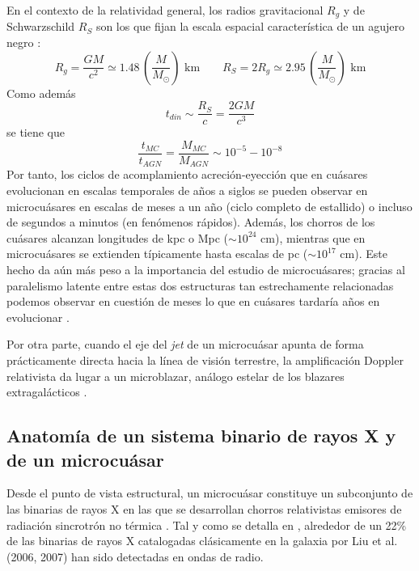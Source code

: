 En el contexto de la relatividad general, los radios gravitacional $R_g$ y de Schwarzschild $R_S$ son los que fijan la escala espacial característica de un agujero negro \cite{chaty,mornas2026bloque1}:
\begin{equation}
    R_g=\frac{GM}{c^2}\simeq 1.48\,\left(\frac{M}{M_\odot}\right)\mbox{ km}\qquad R_S=2 R_g\simeq 2.95\,\left(\frac{M}{M_\odot}\right)\mbox{ km}
\end{equation}
Como además
\begin{equation}
    t_{din}\sim\frac{R_S}{c}=\frac{2GM}{c^3}
\end{equation}
se tiene que \cite{chaty,mirabel}
\begin{equation}
    \frac{t_{MC}}{t_{AGN}}=\frac{M_{MC}}{M_{AGN}}\sim 10^{-5}-10^{-8}
\end{equation}
Por tanto, los ciclos de acomplamiento acreción-eyección que en cuásares evolucionan en escalas temporales de años a siglos se pueden observar en microcuásares en escalas de meses a un año (ciclo completo de estallido) o incluso de segundos a minutos (en fenómenos rápidos). Además, los chorros de los cuásares alcanzan longitudes de kpc o Mpc ($\sim 10^{24}$ cm), mientras que en microcuásares se extienden típicamente hasta escalas de pc ($\sim 10^{17}$ cm). Este hecho da aún más peso a la importancia del estudio de microcuásares; gracias al paralelismo latente entre estas dos estructuras tan estrechamente relacionadas podemos observar en cuestión de meses lo que en cuásares tardaría años en evolucionar \cite{chaty}. 

Por otra parte, cuando el eje del \textit{jet} de un microcuásar apunta de forma prácticamente directa hacia la línea de visión terrestre, la amplificación Doppler relativista da lugar a un microblazar, análogo estelar de los blazares extragalácticos \cite{mirabel}.

\subsection{Anatomía de un sistema binario de rayos X y de un microcuásar}

\noindent Desde el punto de vista estructural, un microcuásar constituye un subconjunto de las binarias de rayos X en las que se desarrollan chorros relativistas emisores de radiación sincrotrón no térmica \cite{paredes}. Tal y como se detalla en \cite{paredes}, alrededor de un 22\% de las binarias de rayos X catalogadas clásicamente en la galaxia por Liu et al. (2006, 2007) han sido detectadas en ondas de radio. 

